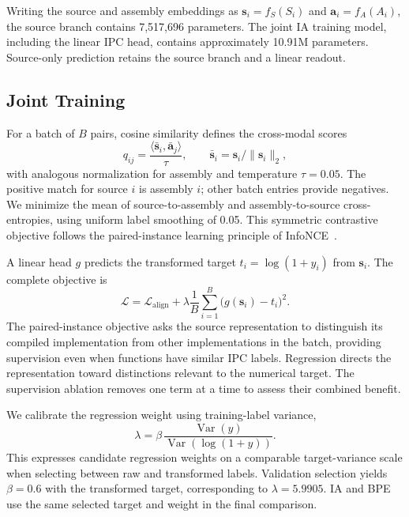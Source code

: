 \documentclass[conference]{IEEEtran}
\begin{document}
Writing the source and assembly embeddings as $\mathbf{s}_i=f_S(S_i)$ and $\mathbf{a}_i=f_A(A_i)$, the source branch contains 7,517,696 parameters. The joint IA training model, including the linear IPC head, contains approximately 10.91M parameters. Source-only prediction retains the source branch and a linear readout.

\subsection{Joint Training}
For a batch of $B$ pairs, cosine similarity defines the cross-modal scores
\begin{equation}
q_{ij}=\frac{\langle \bar{\mathbf{s}}_i,\bar{\mathbf{a}}_j\rangle}{\tau},\qquad \bar{\mathbf{s}}_i=\mathbf{s}_i/\lVert\mathbf{s}_i\rVert_2,
\end{equation}
with analogous normalization for assembly and temperature $\tau=0.05$. The positive match for source $i$ is assembly $i$; other batch entries provide negatives. We minimize the mean of source-to-assembly and assembly-to-source cross-entropies, using uniform label smoothing of 0.05. This symmetric contrastive objective follows the paired-instance learning principle of InfoNCE~\cite{oord2018representation}.

A linear head $g$ predicts the transformed target $t_i=\log(1+y_i)$ from $\mathbf{s}_i$. The complete objective is
\begin{equation}
\mathcal{L}=\mathcal{L}_{\mathrm{align}}+\lambda\frac{1}{B}\sum_{i=1}^{B}\bigl(g(\mathbf{s}_i)-t_i\bigr)^2 .
\label{eq:joint}
\end{equation}
The paired-instance objective asks the source representation to distinguish its compiled implementation from other implementations in the batch, providing supervision even when functions have similar IPC labels. Regression directs the representation toward distinctions relevant to the numerical target. The supervision ablation removes one term at a time to assess their combined benefit.

We calibrate the regression weight using training-label variance,
\begin{equation}
\lambda=\beta\,\frac{\operatorname{Var}(y)}{\operatorname{Var}(\log(1+y))}.
\end{equation}
This expresses candidate regression weights on a comparable target-variance scale when selecting between raw and transformed labels. Validation selection yields $\beta=0.6$ with the transformed target, corresponding to $\lambda=5.9905$. IA and BPE use the same selected target and weight in the final comparison.
\end{document}
